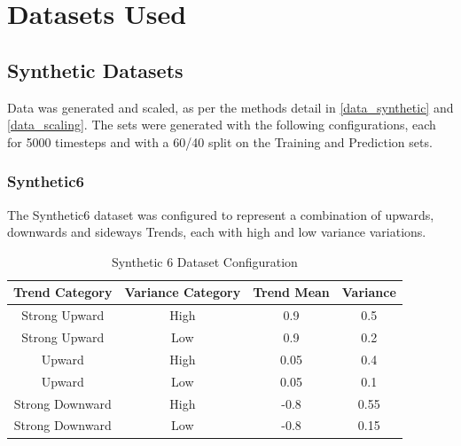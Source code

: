 \documentclass[a4paper,11pt,oneside]{article}
\theoremstyle{plain}
\theoremstyle{definition}
\begin{document}
	
	
	
	
	
	
	
	
	
	
	
	
	
	
	
	
	
	
	
	
	
	\newpage
	\section{Datasets Used}\label{Datasets}
	
	\subsection{Synthetic Datasets}
	
	Data was generated and scaled, as per the methods detail in \ref{data_synthetic} and \ref{data_scaling}. The sets were generated with the following configurations, each for 5000 timesteps and with a 60/40 split on the Training and Prediction sets.
	
	\subsubsection{Synthetic6} \label{dataset_synthetic6}
	
	The Synthetic6 dataset was configured to represent a combination of upwards, downwards and sideways Trends, each with high and low variance variations.
	
	\begin{table}[h]
		\centering
		\begin{tabular}{|c|c|c|c|}
			\hline
			\textbf{Trend Category} &\textbf{Variance Category} & \textbf{Trend Mean} & \textbf{Variance}\\\hline	
			{Strong Upward} & {High} & {0.9} & {0.5} \\\hline
			{Strong Upward} & {Low} & {0.9} & {0.2} \\\hline
			{Upward} & {High} & {0.05} & {0.4} \\\hline
			{Upward} & {Low} & {0.05} & {0.1} \\\hline
			{Strong Downward} & {High} & {-0.8} & {0.55} \\\hline
			{Strong Downward} & {Low} & {-0.8} & {0.15} \\\hline
		\end{tabular}
		\newline\newline
		\caption{Synthetic 6 Dataset Configuration}\label{tab_synth6}
	\end{table}
	
\end{document}

